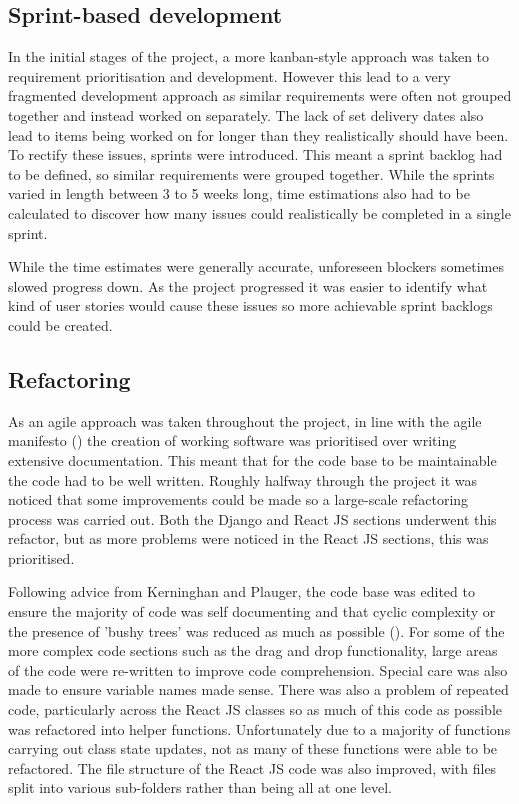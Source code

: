 \documentclass[l4proj.tex]{subfiles}
\begin{document}
\subsection{Sprint-based development}
In the initial stages of the project, a more kanban-style approach was taken to requirement prioritisation and development. However this lead to a very fragmented development approach as similar requirements were often not grouped together and instead worked on separately. The lack of set delivery dates also lead to items being worked on for longer than they realistically should have been. To rectify these issues, sprints were introduced. This meant a sprint backlog had to be defined, so similar requirements were grouped together. While the sprints varied in length between 3 to 5 weeks long, time estimations also had to be calculated to discover how many issues could realistically be completed in a single sprint. 

While the time estimates were generally accurate, unforeseen blockers sometimes slowed progress down. As the project progressed it was easier to identify what kind of user stories would cause these issues so more achievable sprint backlogs could be created. 


\subsection{Refactoring}
 As an agile approach was taken throughout the project, in line with the agile manifesto (\cite{Kent2001(manifesto)}) the creation of working software was prioritised over writing extensive documentation. This meant that for the code base to be maintainable the code had to be well written. Roughly halfway through the project it was noticed that some improvements could be made so a large-scale refactoring process was carried out. Both the Django and React JS sections underwent this refactor, but as more problems were noticed in the React JS sections, this was prioritised.

 Following advice from Kerninghan and Plauger, the code base was edited to ensure the majority of code was self documenting and that cyclic complexity or the presence of 'bushy trees' was reduced as much as possible (\cite{Kernignhan1974}). For some of the more complex code sections such as the drag and drop functionality, large areas of the code were re-written to improve code comprehension. Special care was also made to ensure variable names made sense. There was also a problem of repeated code, particularly across the React JS classes so as much of this code as possible was refactored into helper functions. Unfortunately due to a majority of functions carrying out class state updates, not as many of these functions were able to be refactored. The file structure of the React JS code was also improved, with files split into various sub-folders rather than being all at one level. 
\end{document}
